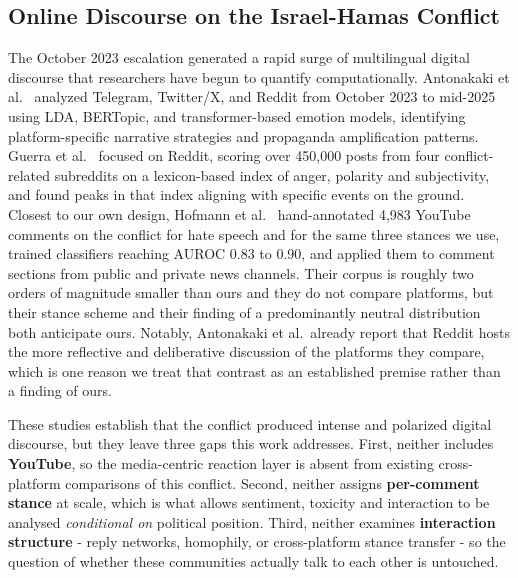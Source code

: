 \documentclass[pdflatex,sn-basic,Numbered,iicol]{sn-jnl}
\begin{document}
\subsection{Online Discourse on the Israel-Hamas Conflict}
The October 2023 escalation generated a rapid surge of multilingual digital
discourse that researchers have begun to quantify computationally. Antonakaki
et al.~\cite{antonakaki2025} analyzed Telegram, Twitter/X, and Reddit from October
2023 to mid-2025 using LDA, BERTopic, and transformer-based emotion models,
identifying platform-specific narrative strategies and propaganda amplification
patterns. Guerra et al.~\cite{guerra2025} focused on Reddit, scoring over
450{,}000 posts from four conflict-related subreddits on a lexicon-based index of
anger, polarity and subjectivity, and found peaks in that index aligning with
specific events on the ground. Closest
to our own design, Hofmann et al.~\cite{hofmann2026} hand-annotated 4{,}983
YouTube comments on the conflict for hate speech and for the same three stances
we use, trained classifiers reaching AUROC 0.83 to 0.90, and applied them to
comment sections from public and private news channels. Their corpus is roughly
two orders of magnitude smaller than ours and they do not compare platforms, but
their stance scheme and their finding of a predominantly neutral distribution
both anticipate ours. Notably, Antonakaki et al.\ already report that Reddit
hosts the more reflective and deliberative discussion of the platforms they
compare, which is one reason we treat that contrast as an established premise
rather than a finding of ours.

These studies establish that the conflict produced intense and polarized digital
discourse, but they leave three gaps this work addresses. First, neither includes
\textbf{YouTube}, so the media-centric reaction layer is absent from existing
cross-platform comparisons of this conflict. Second, neither assigns
\textbf{per-comment stance} at scale, which is what allows sentiment, toxicity and
interaction to be analysed \emph{conditional on} political position. Third, neither
examines \textbf{interaction structure} - reply networks, homophily, or
cross-platform stance transfer - so the question of whether these communities
actually talk to each other is untouched.
\end{document}
